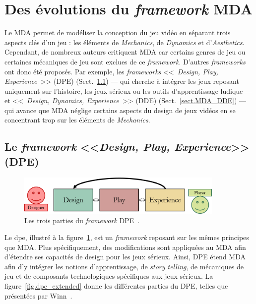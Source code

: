 \section{Des évolutions du \emph{framework} MDA}

Le MDA permet de modéliser la conception du jeu vidéo en séparant trois aspects cl\'es d'un jeu : les éléments de \emph{Mechanics}, de \emph{Dynamics} et d'\emph{Aesthetics}.
Cependant, de nombreux auteurs critiquent MDA car certains genres de jeu ou certaines mécaniques de jeu sont exclues de ce \emph{framework}.
%
D'autres \emph{frameworks} ont donc été proposés.
%
Par exemple, les \emph{frameworks} <<~\emph{Design, Play, Experience}~>> (DPE) (Sect.~\ref{sect.MDA_DPE}) --- qui cherche à intégrer les jeux reposant uniquement sur l'histoire, les jeux sérieux ou les outils d'apprentissage ludique ---
%
et <<~\emph{Design, Dynamics, Experience}~>> (DDE) (Sect.~\ref{sect.MDA_DDE}) --- qui avance que MDA néglige certains aspects du design de jeux vidéos en se concentrant trop sur les éléments de \emph{Mechanics}.



\subsection{Le \emph{framework} <<\emph{Design, Play, Experience}>> (DPE)}
\label{sect.MDA_DPE}

\begin{figure}[H]
    \centering
    \includegraphics[width=10cm]{10_img/chap3/dpe.png} 
    \caption{Les trois parties du \emph{framework} DPE~\cite{Winn2011}.}
    \label{fig.dpe}
\end{figure}

Le \gls{dpe}, illustr\'e \`a la figure~\ref{fig.dpe}, est un \emph{framework} reposant sur les mêmes principes que MDA. 
Plus sp\'ecifiquement, des modifications sont appliquées au MDA afin d'étendre ses capacités de design pour les jeux sérieux. 
Ainsi, DPE étend MDA afin d'y intégrer les notions d'apprentissage, de \emph{story telling}, de mécaniques de jeu et de composants technologiques spécifiques aux jeux sérieux. 
La figure~\ref{fig.dpe_extended} donne les différentes parties du DPE, telles que présentées par Winn~\cite{Winn2011}.


